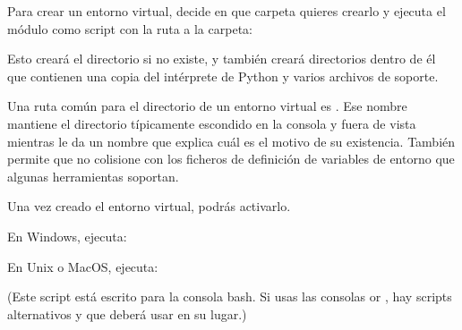 \documentclass[a4,10pt,spanish]{sphinxmanual}
\begin{document}
\sphinxAtStartPar
Para crear un entorno virtual, decide en que carpeta quieres crearlo y ejecuta el módulo  como script con la ruta a la carpeta:

\begin{sphinxVerbatim}[commandchars=\\\{\}]
   
\end{sphinxVerbatim}

\sphinxAtStartPar
Esto creará el directorio  si no existe, y también creará directorios dentro de él que contienen una copia del intérprete de Python y varios archivos de soporte.

\sphinxAtStartPar
Una ruta común para el directorio de un entorno virtual es . Ese nombre mantiene el directorio típicamente escondido en la consola y fuera de vista mientras le da un nombre que explica cuál es el motivo de su existencia. También permite que no colisione con los ficheros de definición de variables de entorno  que algunas herramientas soportan.

\sphinxAtStartPar
Una vez creado el entorno virtual, podrás activarlo.

\sphinxAtStartPar
En Windows, ejecuta:

\begin{sphinxVerbatim}[commandchars=\\\{\}]
\PYGZbs{}\PYGZbs{}
\end{sphinxVerbatim}

\sphinxAtStartPar
En Unix o MacOS, ejecuta:

\begin{sphinxVerbatim}[commandchars=\\\{\}]
 
\end{sphinxVerbatim}

\sphinxAtStartPar
(Este script está escrito para la consola bash. Si usas las consolas  or , hay scripts alternativos  y  que deberá usar en su lugar.)
\end{document}
